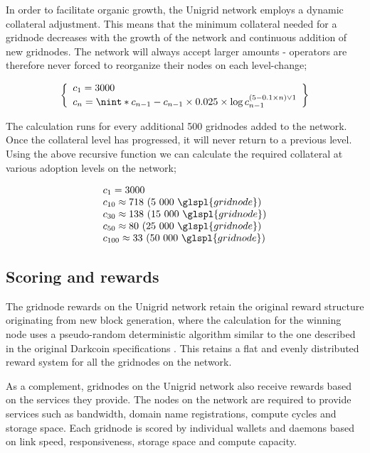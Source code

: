 \documentclass[10pt,a4paper,final]{article}
\DeclarePairedDelimiter{\nint}\lfloor\rceil
\begin{document}
In order to facilitate organic growth, the Unigrid network employs a dynamic collateral adjustment. This means that the minimum collateral needed for a \gls{gridnode} decreases with the growth of the network and continuous addition of new \glspl{gridnode}. The network will always accept larger amounts - operators are therefore never forced to reorganize their nodes on each level-change;

\[
	\left\{
		\begin{array}{l}
		c_1 = 3000\\
		c_n = \nint*{ c_{n - 1} - c_{n - 1} \times 0.025 \times \log c_{n - 1}^{(5 - 0.1  \times n) \vee 1} }\\
		\end{array}
	\right\}
\]

\noindent The calculation runs for every additional 500 \glspl{gridnode} added to the network. Once the collateral level has progressed, it will never return to a previous level. Using the above recursive function we can calculate the required collateral at various adoption levels on the network;

\[
	\begin{array}{l}
	c_1 = 3000\\
	c_{10} \approx 718\ (5\ 000\ \glspl{gridnode})\\
	c_{30} \approx 138\ (15\ 000\ \glspl{gridnode})\\
	c_{50} \approx 80\ (25\ 000\ \glspl{gridnode})\\
	c_{100} \approx 33\ (50\ 000\ \glspl{gridnode})
	\end{array}
\]

\subsection{Scoring and rewards}
\label{section:scoring}
The \gls{gridnode} rewards on the Unigrid network retain the original reward structure originating from new block generation, where the calculation for the winning node uses a pseudo-random deterministic algorithm similar to the one described in the original Darkcoin specifications \cite{darkcoin2014}. This retains a flat and evenly distributed reward system for all the \glspl{gridnode} on the network.

As a complement, \glspl{gridnode} on the Unigrid network also receive rewards based on the services they provide. The nodes on the network are required to provide services such as bandwidth, domain name registrations, compute cycles and storage space. Each \gls{gridnode} is scored by individual wallets and daemons based on link speed, responsiveness, storage space and compute capacity.
\end{document}
